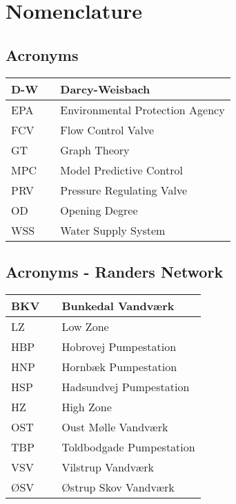 \chapter{Nomenclature}

\section*{Acronyms}
	
	\begin{tabular}{|l c l|} \hline
		D-W     &&	Darcy-Weisbach									\\ \hline
		EPA     &&	Environmental Protection Agency					\\ \hline
		FCV     &&	Flow Control Valve								\\ \hline
		GT      &&	Graph Theory									\\ \hline
		MPC 	&&	Model Predictive Control						\\ \hline		
		PRV     &&	Pressure Regulating Valve						\\ \hline
		OD		&&	Opening Degree									\\ \hline
		WSS 	&&	Water Supply System								\\ \hline
	\end{tabular}

\section*{Acronyms - Randers Network}
	
	\begin{tabular}{|l c l|} \hline
		BKV     &&	Bunkedal Vandværk 					\\ \hline
		LZ      &&	Low Zone												\\ \hline
		HBP     &&	Hobrovej Pumpestation 		\\ \hline
		HNP     &&	Hornbæk Pumpestation 			\\ \hline
		HSP 	&&	Hadsundvej Pumpestation 	\\ \hline		
		HZ      &&	High Zone												\\ \hline
		OST		&&	Oust Mølle Vandværk 				\\ \hline
		TBP 	&&	Toldbodgade Pumpestation 	\\ \hline
		VSV 	&&	Vilstrup Vandværk 					\\ \hline
		ØSV 	&&	Østrup Skov Vandværk 			\\ \hline
	\end{tabular}

\newpage

